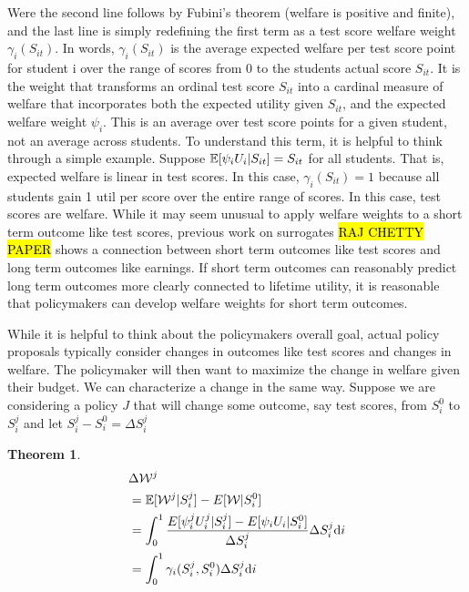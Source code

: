 \documentclass[12pt]{article}
\theoremstyle{definition}
\theoremstyle{definition}
\theoremstyle{definition}
\theoremstyle{definition}
\newtheorem{thm}{Theorem}
\begin{document}
   Were the second line follows by Fubini's theorem (welfare is positive and finite), and the last line is simply redefining the first term as a test score welfare weight $\gamma_i(S_{it})$. In words, $\gamma_i(S_{it})$  is the average expected welfare per test score point for student i over the range of scores from 0 to the students actual score $S_{it}$. It is the weight that transforms an ordinal test score $S_{it}$ into a cardinal measure of welfare that incorporates both the expected utility given $S_{it}$, and the expected welfare weight $\psi_i$. This is an average over test score points for a given student, not an average across students. To understand this term, it is helpful to think through a simple example. Suppose  $ \mathbb{E}[ \psi_i U_{i} |S_{it}]= S_{it}$ for all students. That is, expected welfare is linear in test scores. In this case,  $\gamma_i(S_{it}) = 1$ because all students gain 1 util per score over the entire range of scores. In this case, test scores are welfare. While it may seem unusual to apply welfare weights to a short term outcome like test scores, previous work on surrogates \hl{RAJ CHETTY PAPER} shows a connection between short term outcomes like test scores and long term outcomes like earnings. If short term outcomes can reasonably predict long term outcomes more clearly connected to lifetime utility, it is reasonable that policymakers can develop welfare weights for short term outcomes. 

   While it is helpful to think about the policymakers overall goal, actual policy proposals typically consider changes in outcomes like test scores and changes in welfare. The policymaker will then want to maximize the change in welfare given their budget. We can characterize a change in the same way. Suppose we are considering a policy $J$ that will change some outcome, say test scores, from $S_i^0$ to $S_i^j$ and let $S_i^j- S_i^0 = \Delta S^j_i$

    \begin{thm}
    \label{def_welfare_change}
    \begin{align}
           &  \Delta \mathcal{W}^j \\
           & = \mathbb{E}[\mathcal{W}^j|S_i^j] - E[\mathcal{W}|S_i^0]  \\
           &  = \int_0^1 \frac{E[\psi^j_i U^j_i |S_i^j] - E[\psi_i U_i |S_i^0]}{\Delta S^j_i} \Delta S^j_i\text{d}i \\ 
          &   = \int_0^1 \gamma_i(S_i^j, S_i^0) \Delta S^j_i \text{d}i
    \end{align}
    \end{thm}
\end{document}
